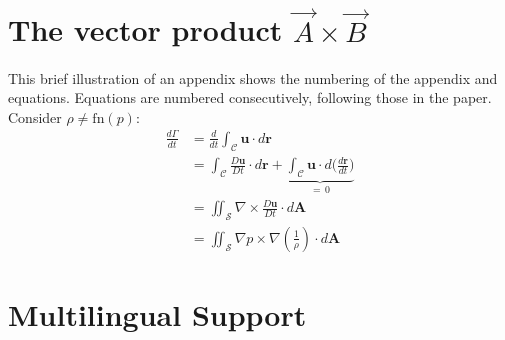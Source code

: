 \documentclass[grid,balance,upint,subscriptcorrection,varvw,mathalfa=cal=euler,spanish,french,greek,russian,vietnamese,colorlinks]{asmeconf}
\begin{document}
\nocite{*}%



\appendix


\section[The Vector Product A\times B]{The vector product $\vec{A}\times\vec{B}$}\label{appendix:a}

This brief illustration of an appendix shows the numbering of the appendix and equations. Equations are numbered
consecutively, following those in the paper. Consider $\rho \neq \textrm{fn}(p)$:
\begin{align}
\frac{d\Gamma}{dt} &{}= \frac{d}{dt} \int_{\mathcal{C}} \mathbf{u} \cdot d\mathbf{r}\\
				   &{}= \int_{\mathcal{C}} \frac{D\mathbf{u}}{Dt} \cdot d\mathbf{r} + \underbrace{\int_{\mathcal{C}} \mathbf{u}\cdot d\biggl( \frac{d\mathbf{r}}{dt}\Biggr)}_{=\, 0} \\[-2pt]
                   &{}= \iint_{\mathcal{S}} \nabla \times \frac{D\mathbf{u}}{Dt}  \cdot d\mathbf{A}\\
                   &{}= \iint_{\mathcal{S}}  \nabla p \times \nabla \left( \frac{1}{\rho}\right) \cdot d\mathbf{A}
\end{align}

\section{Multilingual Support}\label{appendix:b}
\end{document}
